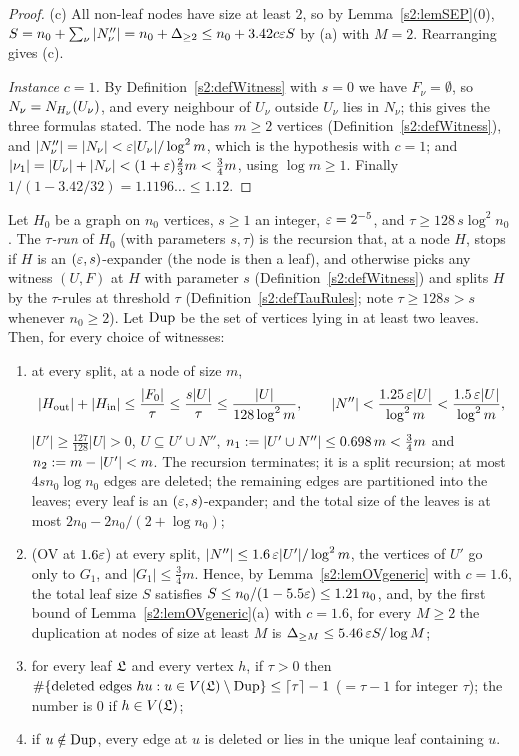 \begin{proof}
(c) All non-leaf nodes have size at least $2$, so by
Lemma~\ref{s2:lemSEP}(0), $S=n_0+\sum_\nu|N''_\nu|=n_0+\Delta_{\ge2}\le
n_0+3.42c\varepsilon S$ by (a) with $M=2$. Rearranging gives (c).

\emph{Instance $c=1$.} By Definition~\ref{s2:defWitness} with $s=0$ we have
$F_\nu=\emptyset$, so $N_\nu=N_{H_\nu}(U_\nu)$, and every neighbour of
$U_\nu$ outside $U_\nu$ lies in $N_\nu$; this gives the three formulas stated.
The node has $m\ge2$ vertices (Definition~\ref{s2:defWitness}), and
$|N''_\nu|=|N_\nu|<\varepsilon|U_\nu|/\log^2m$, which is the hypothesis with $c=1$;
and $|\nu_1|=|U_\nu|+|N_\nu|<(1+\varepsilon)\frac23m<\frac34m$, using $\log m\ge1$.
Finally $1/(1-3.42/32)=1.1196\ldots\le1.12$.
\end{proof}

\begin{lemma}\label{s2:lem14tau}
Let $H_0$ be a graph on $n_0$ vertices, $s\ge1$ an integer, $\varepsilon=2^{-5}$, and
$\tau\ge128\,s\log^2n_0$. The \emph{$\tau$-run} of $H_0$ (with parameters
$s,\tau$) is the recursion that, at a node $H$, stops if $H$ is an
$(\varepsilon,s)$-expander (the node is then a leaf), and otherwise picks any witness
$(U,F)$ at $H$ with parameter $s$ (Definition~\ref{s2:defWitness}) and splits
$H$ by the $\tau$-rules at threshold $\tau$ (Definition~\ref{s2:defTauRules};
note $\tau\ge128s>s$ whenever $n_0\ge2$). Let $\mathrm{Dup}$ be the set of vertices
lying in at least two leaves. Then, for every choice of witnesses:
\begin{enumerate}
\item[(a)] at every split, at a node of size $m$,
\[
|H_{\mathrm{out}}|+|H_{\mathrm{in}}|\le\frac{|F_0|}{\tau}\le\frac{s|U|}{\tau}\le\frac{|U|}{128\log^2m},
\qquad |N''|<\frac{1.25\,\varepsilon|U|}{\log^2m}<\frac{1.5\,\varepsilon|U|}{\log^2m},
\]
$|U'|\ge\frac{127}{128}|U|>0$, $U\subseteq U'\cup N''$, $n_1\mathrel{:=}|U'\cup
N''|\le0.698\,m<\frac34m$ and $n_2\mathrel{:=} m-|U'|<m$. The recursion terminates;
it is a split recursion; at most $4sn_0\log n_0$ edges are deleted; the
remaining edges are partitioned into the leaves; every leaf is an
$(\varepsilon,s)$-expander; and the total size of the leaves is at most
$2n_0-2n_0/(2+\log n_0)$;
\item[(b)] (OV at $1.6\varepsilon$) at every split, $|N''|\le1.6\,\varepsilon|U'|/\log^2m$,
the vertices of $U'$ go only to $G_1$, and $|G_1|\le\frac34m$. Hence, by
Lemma~\ref{s2:lemOVgeneric} with $c=1.6$, the total leaf size $S$ satisfies
$S\le n_0/(1-5.5\varepsilon)\le1.21\,n_0$, and, by the first bound of
Lemma~\ref{s2:lemOVgeneric}(a) with $c=1.6$, for every $M\ge2$ the duplication at
nodes of size at least $M$ is $\Delta_{\ge M}\le5.46\,\varepsilon S/\log M$;
\item[(c)] for every leaf $\mathfrak{L}$ and every vertex $h$, if $\tau>0$ then
$\#\{\text{deleted edges }hu:u\in V(\mathfrak{L})\setminus\mathrm{Dup}\}\le\lceil\tau\rceil-1$
($=\tau-1$ for integer $\tau$); the number is $0$ if $h\in V(\mathfrak{L})$;
\item[(d)] if $u\notin\mathrm{Dup}$, every edge at $u$ is deleted or lies in the unique
leaf containing $u$.
\end{enumerate}
\deps{\ref{s1:citLem14}, \ref{s1:citDef11}, \ref{s2:defTauRules}, \ref{s2:lemThinCut}, \ref{s2:lemOVgeneric}, \ref{s2:lemSEP}, \ref{s2:defWitness}}
\end{lemma}

